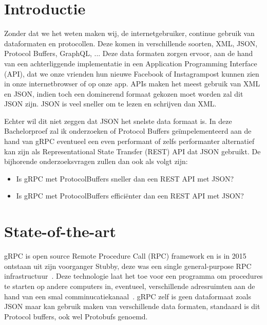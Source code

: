 
\section{Introductie} %
\label{sec:introductie}

Zonder dat we het weten maken wij, de internetgebruiker, continue gebruik van dataformaten en protocollen. Deze komen in verschillende soorten, XML, JSON, Protocol Buffers, GraphQL, ... Deze data formaten zorgen ervoor, aan de hand van een achterliggende implementatie in een Application Programming Interface (API), dat we onze vrienden hun nieuwe Facebook of Instagrampost kunnen zien in onze internetbrowser of op onze app. 
APIs maken het meest gebruik van XML en JSON, indien toch een dominerend formaat gekozen moet worden zal dit JSON zijn. JSON is veel sneller om te lezen en schrijven dan XML.

Echter wil dit niet zeggen dat JSON het snelste data formaat is. In deze Bachelorproef zal ik onderzoeken of Protocol Buffers geïmpelementeerd aan de hand van gRPC eventueel een even performant of zelfs performanter alternatief kan zijn als Representational State Transfer (REST) API dat JSON gebruikt. De bijhorende onderzoeksvragen zullen dan ook als volgt zijn:


\begin{itemize}
  \item Is gRPC met ProtocolBuffers sneller dan een REST API met JSON?
  \item Is gRPC met ProtocolBuffers efficiënter dan een REST API met JSON?
\end{itemize}


\section{State-of-the-art}
\label{sec:state-of-the-art}
gRPC is open source Remote Procedure Call (RPC) framework en is in 2015 ontstaan uit zijn voorganger Stubby, deze was een single general-purpose RPC infrastructuur~\autocite{Chalin}. Deze technologie laat het toe voor een programma om procedures te starten op andere computers in, eventueel, verschillende adresruimten aan de hand van een smal comminucatiekanaal~\autocite{Nelson1981}. gRPC zelf is geen dataformaat zoals JSON maar kan gebruik maken van verschillende data formaten, standaard is dit Protocol buffers, ook wel Protobufs genoemd.

